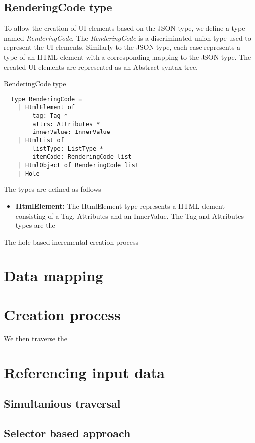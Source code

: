 \subsection{RenderingCode type}
To allow the creation of UI elements based on the JSON type, we define a type named \emph{RenderingCode}.
The \emph{RenderingCode} is a discriminated union type used to represent the UI elements.
Similarly to the JSON type, each case represents a type of an HTML element with a corresponding mapping to the JSON type.
The created UI elements are represented as an Abstract syntax tree.
\begin{listing}[H]
	\caption {RenderingCode type}
	\begin{lstlisting}
  type RenderingCode =
    | HtmlElement of
        tag: Tag *
        attrs: Attributes *
        innerValue: InnerValue
    | HtmlList of
        listType: ListType *
        itemCode: RenderingCode list
    | HtmlObject of RenderingCode list
    | Hole
  \end{lstlisting}
\end{listing}

The types are defined as follows:
\begin{itemize}
	\item{ \textbf{HtmlElement:} The HtmlElement type represents a HTML element consisting of a Tag, Attributes and an InnerValue.
	      The Tag and Attributes types are the
	      }


\end{itemize}

The hole-based incremental creation process

\section{Data mapping}
\section{Creation process}


We then traverse the

\section{Referencing input data}
\subsection{Simultanious traversal}
\subsection{Selector based approach}

